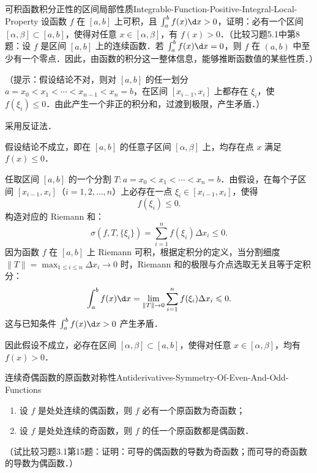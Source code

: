 \begin{problem}{可积函数积分正性的区间局部性质}{Integrable-Function-Positive-Integral-Local-Property}
    设函数 $f$ 在 $[a, b]$ 上可积，且 $\int_a^b f(x) \d x > 0$，证明：必有一个区间 $[\alpha, \beta] \subset [a, b]$，使得对任意 $x \in [\alpha, \beta]$，有 $f(x) > 0$．（比较习题5.1中第8题：设 $f$ 是区间 $[a, b]$ 上的连续函数．若 $\int_a^b f(x) \d x = 0$，则 $f$ 在 $(a, b)$ 中至少有一个零点．因此，由函数的积分这一整体信息，能够推断函数值的某些性质．）

    （提示：假设结论不对，则对 $[a, b]$ 的任一划分 $a = x_0 < x_1 < \cdots < x_{n-1} < x_n = b$，在区间 $[x_{i-1}, x_i]$ 上都存在 $\xi_i$，使 $f(\xi_i) \leqslant 0$．由此产生一个非正的积分和，过渡到极限，产生矛盾．）
\end{problem}

\begin{myproof}
    采用反证法．

    假设结论不成立，即在 $[a, b]$ 的任意子区间 $[\alpha, \beta]$ 上，均存在点 $x$ 满足 $f(x) \leqslant 0$．

    任取区间 $[a, b]$ 的一个分割 $T : a = x_0 < x_1 < \cdots < x_n = b$．由假设，在每个子区间 $[x_{i-1}, x_i]$（$i = 1, 2, \dots, n$）上必存在一点 $\xi_i \in [x_{i-1}, x_i]$，使得
    \begin{equation}
        f(\xi_i) \leqslant 0.
    \end{equation}
    构造对应的 Riemann 和：
    \begin{equation}
        \sigma(f, T, \{\xi_i\}) = \sum_{i=1}^n f(\xi_i)\Delta x_i \leqslant 0.
    \end{equation}
    因为函数 $f$ 在 $[a, b]$ 上 Riemann 可积，根据定积分的定义，当分割细度 $\|T\| = \max_{1\leqslant i\leqslant n} \Delta x_i \to 0$ 时，Riemann 和的极限与介点选取无关且等于定积分：
    \begin{equation}
        \int_a^b f(x)\d x = \lim_{\|T\|\to 0} \sum_{i=1}^n f(\xi_i)\Delta x_i \leqslant 0.
    \end{equation}
    这与已知条件 $\int_a^b f(x)\d x > 0$ 产生矛盾．

    因此假设不成立，必存在区间 $[\alpha, \beta] \subset [a, b]$，使得对任意 $x \in [\alpha, \beta]$，均有 $f(x) > 0$．
\end{myproof}

\begin{problem}{连续奇偶函数的原函数对称性}{Antiderivatives-Symmetry-Of-Even-And-Odd-Functions}
    \begin{enumerate}
        \item 设 $f$ 是处处连续的偶函数，则 $f$ 必有一个原函数为奇函数；
        \item 设 $f$ 是处处连续的奇函数，则 $f$ 的任一个原函数都是偶函数．
    \end{enumerate}
    （试比较习题3.1第15题：证明：可导的偶函数的导数为奇函数；而可导的奇函数的导数为偶函数．）
\end{problem}

